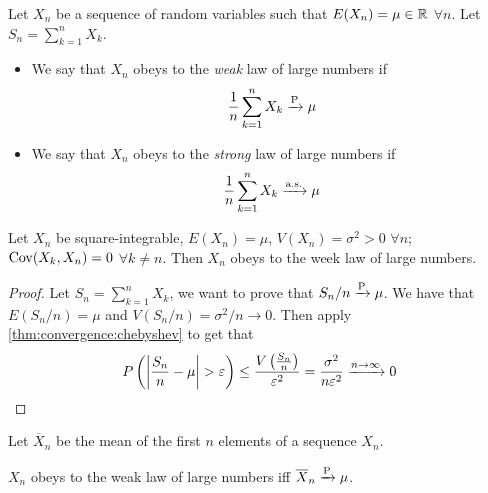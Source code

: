 \documentclass[12pt]{extarticle}
\newcommand{\cov}{{\operatorfont Cov}}
\newcommand{\convas}{\xrightarrow{\operatorfont a.s.}}
\newcommand{\convprob}{\xrightarrow{\operatorfont P}}
\begin{document}
\begin{definition}
    Let $X_n$ be a sequence of random variables such that $E(X_n) = \mu \in \mathbb{R}$ $\forall n$.
    Let $S_n = \sum_{k = 1}^n X_k$.
    \begin{itemize}
        \item We say that $X_n$ obeys to the \emph{weak} law of large numbers if
              \begin{equation}
                  \frac{1}{n} \sum^n_{k = 1} X_k \convprob \mu
              \end{equation}
        \item We say that $X_n$ obeys to the \emph{strong} law of large numbers if
              \begin{equation}
                  \frac{1}{n} \sum^n_{k = 1} X_k \convas \mu
              \end{equation}
    \end{itemize}
\end{definition}

\begin{theorem}
    \label{thm:conv:wlln}
    Let $X_n$ be square-integrable, $E(X_n) = \mu$, $V(X_n) = \sigma^2 > 0$ $\forall n$; $\cov(X_k, X_n) = 0$ $\forall k \neq n$.
    Then $X_n$ obeys to the week law of large numbers.
\end{theorem}

\begin{proof}
    Let $S_n = \sum_{k = 1}^n X_k$, we want to prove that $S_n/n \convprob \mu$.
    We have that $E(S_n/n) = \mu$ and $V(S_n/n) = \sigma^2 /n \to 0$.
    Then apply \autoref{thm:convergence:chebyshev} to get that
    \begin{equation}
        P\left(\abs{\frac{S_n}{n} - \mu} > \varepsilon\right) \leq \frac{V\left(\frac{S_n}{n}\right)}{\varepsilon^2} = \frac{\sigma^2}{n \varepsilon^2} \xrightarrow{n \to \infty} 0
    \end{equation}
\end{proof}

\begin{definition}
    Let $\overline X_n$ be the mean of the first $n$ elements of a sequence $X_n$.
\end{definition}

\begin{proposition}
    $X_n$ obeys to the weak law of large numbers iff $\overline X_n \convprob \mu$.
\end{proposition}
\end{document}
